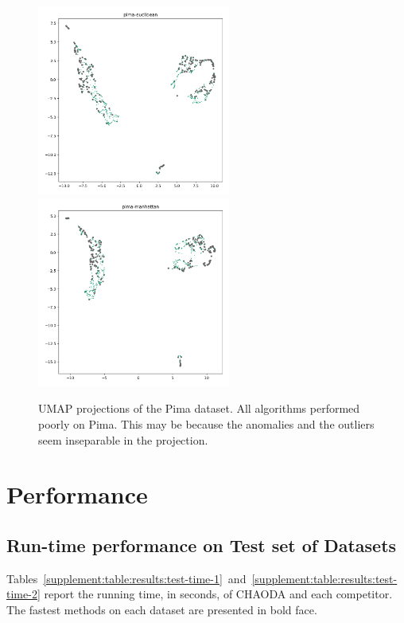 \begin{figure}
   \centering
   \includegraphics[width=2.5in]{images/umaps/pima-euclidean-umap2d.png}
   \includegraphics[width=2.5in]{images/umaps/pima-manhattan-umap2d.png}
   \caption{UMAP projections of the Pima dataset.
   All algorithms performed poorly on Pima.
   This may be because the anomalies and the outliers seem inseparable in the projection.}
   \label{supplement:fig:conclusions:umap-embeddings-2}
\end{figure}


\section{Performance}
\label{supplement:sec:performance}

\subsection{Run-time performance on Test set of Datasets}

Tables~\ref{supplement:table:results:test-time-1}~and~\ref{supplement:table:results:test-time-2} report the running time, in seconds, of CHAODA and each competitor.
The fastest methods on each dataset are presented in bold face.


